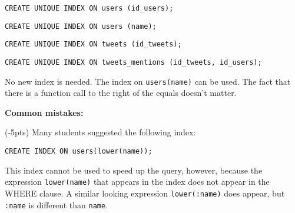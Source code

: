 \documentclass[12pt]{exam}
\theoremstyle{definition}
\begin{document}
\begin{questions}

\begin{solution}

    {\lstinline{CREATE UNIQUE INDEX ON users (id_users);}}

    {\lstinline{CREATE UNIQUE INDEX ON users (name);}}

    {\lstinline{CREATE UNIQUE INDEX ON tweets (id_tweets);}}

    {\lstinline{CREATE UNIQUE INDEX ON tweets_mentions (id_tweets, id_users);}}
\end{solution}

\newpage
{}
\begin{solution}
No new index is needed.
The index on \lstinline{users(name)} can be used.
The fact that there is a function call to the right of the equals doesn't matter.

\noindent
\textbf{Common mistakes:}

(-5pts)
Many students suggested the following index:
\begin{lstlisting}
CREATE INDEX ON users(lower(name));
\end{lstlisting}
This index cannot be used to speed up the query, however, because the expression \lstinline{lower(name)} that appears in the index does not appear in the WHERE clause.
A similar looking expression \lstinline{lower(:name)} does appear, but \lstinline{:name} is different than \lstinline{name}.
\end{solution}

\newpage
{}


\end{questions}
\end{document}
